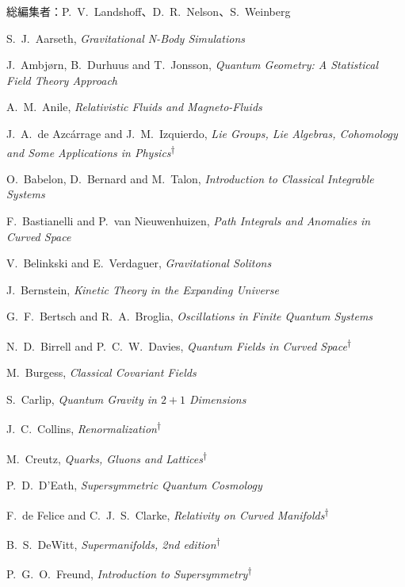 \clearpage
{}
\noindent 総編集者：P.~V.~Landshoff、D.~R.~Nelson、S.~Weinberg
\begingroup
\small
\begin{list}{}{\setlength{\leftmargin}{0pt}\setlength{\rightmargin}{0pt}
\setlength{\itemsep}{2pt}\setlength{\parsep}{0pt}}
\item S.~J.~Aarseth, \emph{Gravitational N-Body Simulations}
\item J.~Ambjørn, B.~Durhuus and T.~Jonsson, \emph{Quantum Geometry: A Statistical Field Theory Approach}
\item A.~M.~Anile, \emph{Relativistic Fluids and Magneto-Fluids}
\item J.~A.~de Azcárrage and J.~M.~Izquierdo, \emph{Lie Groups, Lie Algebras, Cohomology and Some Applications in Physics}\textsuperscript{\(\dagger\)}
\item O.~Babelon, D.~Bernard and M.~Talon, \emph{Introduction to Classical Integrable Systems}
\item F.~Bastianelli and P.~van Nieuwenhuizen, \emph{Path Integrals and Anomalies in Curved Space}
\item V.~Belinkski and E.~Verdaguer, \emph{Gravitational Solitons}
\item J.~Bernstein, \emph{Kinetic Theory in the Expanding Universe}
\item G.~F.~Bertsch and R.~A.~Broglia, \emph{Oscillations in Finite Quantum Systems}
\item N.~D.~Birrell and P.~C.~W.~Davies, \emph{Quantum Fields in Curved Space}\textsuperscript{\(\dagger\)}
\item M.~Burgess, \emph{Classical Covariant Fields}
\item S.~Carlip, \emph{Quantum Gravity in \(2+1\) Dimensions}
\item J.~C.~Collins, \emph{Renormalization}\textsuperscript{\(\dagger\)}
\item M.~Creutz, \emph{Quarks, Gluons and Lattices}\textsuperscript{\(\dagger\)}
\item P.~D.~D'Eath, \emph{Supersymmetric Quantum Cosmology}
\item F.~de Felice and C.~J.~S.~Clarke, \emph{Relativity on Curved Manifolds}\textsuperscript{\(\dagger\)}
\item B.~S.~DeWitt, \emph{Supermanifolds, 2nd edition}\textsuperscript{\(\dagger\)}
\item P.~G.~O.~Freund, \emph{Introduction to Supersymmetry}\textsuperscript{\(\dagger\)}

\end{list}
